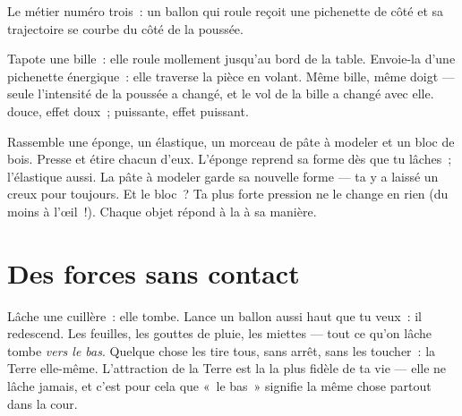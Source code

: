 \begin{omfigure}

{\small Le métier numéro trois~: un ballon qui roule reçoit une
pichenette de côté et sa trajectoire se courbe du côté de la poussée.}
\end{omfigure}

\begin{example}\label{ex:g2:pushes-and-pulls:stronger}
Tapote une bille~: elle roule mollement jusqu'au bord de la table.
Envoie-la d'une pichenette énergique~: elle traverse la pièce en
volant. Même bille, même doigt --- seule l'intensité de la poussée a
changé, et le vol de la bille a changé avec elle.  douce, effet
doux~;  puissante, effet puissant.
\end{example}

\begin{example}\label{ex:g2:pushes-and-pulls:shape}
Rassemble une éponge, un élastique, un morceau de pâte à modeler et
un bloc de bois. Presse et étire chacun d'eux. L'éponge reprend sa
forme dès que tu lâches~; l'élastique aussi. La pâte à modeler garde
sa nouvelle forme --- ta  y a laissé un creux pour toujours. Et
le bloc~? Ta plus forte pression ne le change en rien (du moins à
l'œil~!). Chaque objet répond à la  à sa manière.
\end{example}

\section{Des forces sans contact}

\begin{example}\label{ex:g2:pushes-and-pulls:earthpull}
Lâche une cuillère~: elle tombe. Lance un ballon aussi haut que tu
veux~: il redescend. Les feuilles, les gouttes de pluie, les
miettes --- tout ce qu'on lâche tombe \emph{vers le bas}. Quelque
chose les tire tous, sans arrêt, sans les toucher~: la Terre
elle-même. L'attraction de la Terre est la  la plus fidèle de ta
vie --- elle ne lâche jamais, et c'est pour cela que «~le bas~»
signifie la même chose partout dans la cour.
\end{example}

